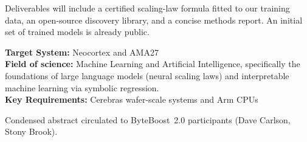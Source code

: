 \documentclass[10pt]{article}
\begin{document}
Deliverables will include a certified scaling-law formula fitted to our training data, an open-source discovery library, and a concise methods report. An initial set of trained models is already public.

\medskip
\noindent\textbf{Target System:} Neocortex and AMA27\\
\textbf{Field of science:} Machine Learning and Artificial Intelligence, specifically the foundations of large language models (neural scaling laws) and interpretable machine learning via symbolic regression.\\
\textbf{Key Requirements:} Cerebras wafer-scale systems and Arm CPUs

\vspace{8pt}
{\footnotesize Condensed abstract circulated to ByteBoost~2.0 participants (Dave Carlson, Stony Brook).}
\end{document}
